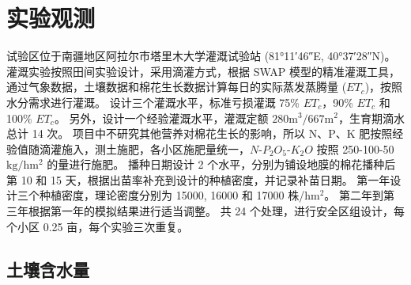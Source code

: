 \section{实验观测}
试验区位于南疆地区阿拉尔市塔里木大学灌溉试验站 (\ang{81;11;46}E, \ang{40;37;28}N)。
灌溉实验按照田间实验设计，采用滴灌方式，根据 SWAP 模型\cite{swap2021}的精准灌溉工具，通过气象数据，土壤数据和棉花生长数据计算每日的实际蒸发蒸腾量 ($ET_c$)，按照水分需求进行灌溉。
设计三个灌溉水平，标准亏损灌溉 75\% $ET_c$，90\% $ET_c$ 和 100\% $ET_c$。
另外，设计一个经验灌溉水平，灌溉定额 $\mathrm{280 m^3 / 667m^2}$，生育期滴水总计 14 次。
项目中不研究其他营养对棉花生长的影响，所以 N、P、K 肥按照经验值随滴灌施入，测土施肥，各小区施肥量统一，$N$-$P_2O_5$-$K_2O$ 按照 250-100-50 $\mathrm{kg/hm^2}$ 的量进行施肥。
播种日期设计 2 个水平，分别为铺设地膜的棉花播种后第 10 和 15 天，根据出苗率补充到设计的种植密度，并记录补苗日期。
第一年设计三个种植密度，理论密度分别为 15000, 16000 和 17000 株/$\mathrm{hm^2}$。
第二年到第三年根据第一年的模拟结果进行适当调整。
共 24 个处理，进行安全区组设计，每个小区 0.25 亩，每个实验三次重复。
\subsection{土壤含水量}

